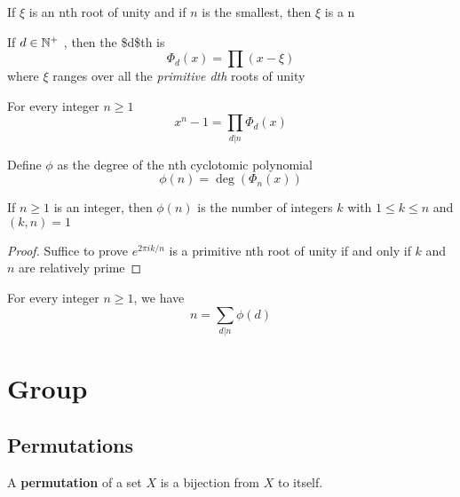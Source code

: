 \documentclass[11pt]{article}
\begin{document}
If \(\xi\) is an nth root of unity and if \(n\) is the smallest, then \(\xi\) is a
 n

\begin{definition}[]
If \(d\in\mathbb{N}^+\) , then the \$d\$th  is 
\begin{equation*}
\Phi_d(x)=\displaystyle\prod(x-\xi)
\end{equation*}
where \(\xi\) ranges over all the \emph{primitive dth} roots of unity
\end{definition}

\begin{proposition}[]
For every integer \(n\ge 1\)
\begin{equation*}
x^n-1=\displaystyle\prod_{d|n}\Phi_d(x)
\end{equation*}
\end{proposition}

\begin{definition}[]
Define  \(\phi\) as the degree of the nth cyclotomic
polynomial
\begin{equation*}
\phi(n)=\deg(\Phi_n(x))
\end{equation*}
\end{definition}

\begin{proposition}[]
If \(n\ge1\) is an integer, then \(\phi(n)\) is the number of integers \(k\) with
\(1\le k\le n\) and \((k,n)=1\)
\end{proposition}

\begin{proof}
Suffice to prove \(e^{2\pi ik/n}\) is a primitive nth root of unity if and only
if \(k\) and \(n\) are relatively prime
\end{proof}

\begin{corollary}[]
For every integer \(n\ge 1\), we have
\begin{equation*}
n=\displaystyle\sum_{d|n}\phi(d)
\end{equation*}
\end{corollary}
\section{Group }
\label{sec:org34ba1dd}
\subsection{Permutations}
\label{sec:org538fa4d}
\begin{definition}[]
A \textbf{permutation} of a set \(X\) is a bijection from \(X\) to itself.
\end{definition}
\end{document}
